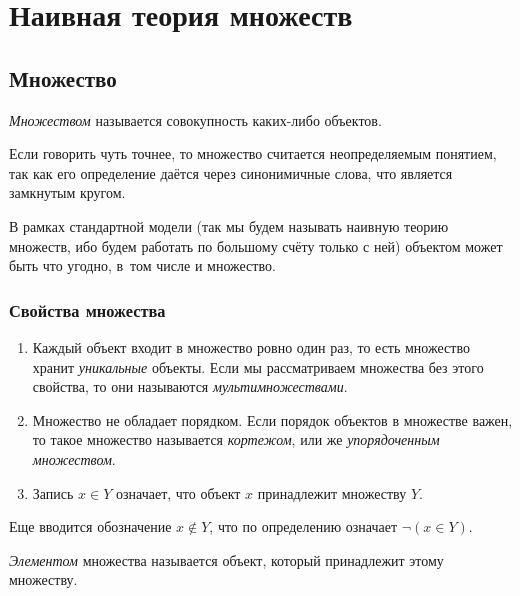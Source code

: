 \section{Наивная теория множеств}
 
\subsection{Множество}
 
\begin{definition}
    \textit{Множеством} называется совокупность каких-либо объектов.
\end{definition}
 
\begin{note}
    Если говорить чуть точнее, то множество считается неопределяемым понятием, так как его определение даётся через синонимичные слова, что является замкнутым кругом.
\end{note}
 
\begin{note}
    В рамках стандартной модели (так мы будем называть наивную теорию множеств, ибо будем работать по большому счёту только с ней) объектом может быть что угодно, в~том числе и множество.
\end{note}
 
\subsubsection*{Свойства множества}
 
\begin{enumerate}
     \item Каждый объект входит в множество ровно один раз, то есть множество хранит \textit{уникальные} объекты. Если мы рассматриваем множества без этого свойства, то они называются \textit{мультимножествами}.
     \item Множество не обладает порядком. Если порядок объектов в множестве важен, то такое множество называется \textit{кортежом}, или же \textit{упорядоченным множеством}.
     \item Запись $x \in Y$ означает, что объект $x$ принадлежит множеству $Y$.
\end{enumerate}

\begin{note}
	Еще вводится обозначение $x \notin Y$, что по определению означает $\neg (x \in Y)$.
\end{note}
 
\begin{definition}
    \textit{Элементом} множества называется объект, который принадлежит этому множеству.
\end{definition}
 
